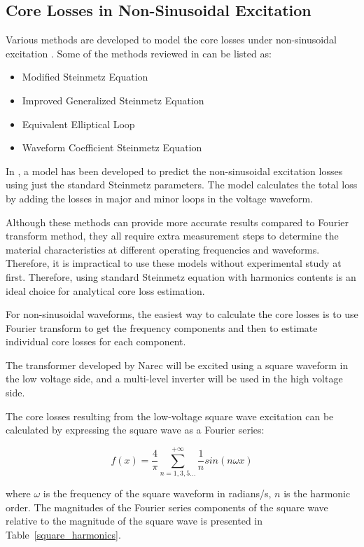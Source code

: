\documentclass[a4paper, 11pt]{article} %
\begin{document}
\subsection{Core Losses in Non-Sinusoidal Excitation}

Various methods are developed to model the core losses under non-sinusoidal excitation \cite{Venkatachalam2002,Reinert2001}. Some of the methods reviewed in \cite{Villar2010} can be listed as:

\begin{itemize}
\item	Modified Steinmetz Equation
\item	Improved Generalized Steinmetz Equation
\item	Equivalent Elliptical Loop
\item	Waveform Coefficient Steinmetz Equation
\end{itemize}

In \cite{Venkatachalam2002}, a model has been developed to predict the non-sinusoidal excitation losses using just the standard Steinmetz parameters. The model calculates the total loss by adding the losses in major and minor loops in the voltage waveform.

Although these methods can provide more accurate results compared to Fourier transform method, they all require extra measurement steps to determine the material characteristics at different operating frequencies and waveforms. Therefore, it is impractical to use these models without experimental study at first. Therefore, using standard Steinmetz equation with harmonics contents is an ideal choice for analytical core loss estimation.

For non-sinusoidal waveforms, the easiest way to calculate the core losses is to use Fourier transform to get the frequency components and then to estimate individual core losses for each component. 

The transformer developed by Narec will be excited using a square waveform in the low voltage side, and a multi-level inverter will be used in the high voltage side.

The core losses resulting from the low-voltage square wave excitation can be calculated by expressing the square wave as a Fourier series:

\begin{equation}
 f(x) = \frac{4}{\pi} \sum_{n=1,3,5...}^{+\infty} \frac{1}{n} sin ( n \omega x )
\end{equation}

where $\omega$ is the frequency of the square waveform in radians/s, $n$ is the harmonic order. The magnitudes of the Fourier series components of the square wave relative to the magnitude of the square wave is presented in Table~\ref{square_harmonics}.
\end{document}
